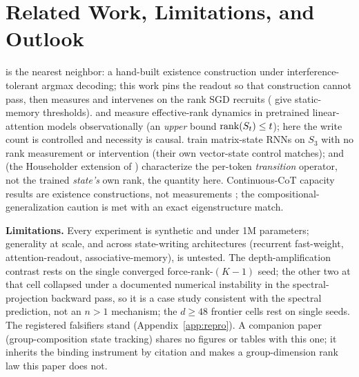 \section{Related Work, Limitations, and Outlook}
\label{sec:related}

\citet{nichani2025factual} is the nearest neighbor: a hand-built
existence construction under interference-tolerant argmax decoding;
this work pins the readout so that construction cannot pass, then
measures and intervenes on the rank SGD recruits
(\citealp{barnfield2026sharp} give static-memory thresholds).
\citet{nazari2026rank} and \citet{sun2026staterank} measure
effective-rank dynamics in pretrained linear-attention models
observationally (an \emph{upper} bound $\operatorname{rank}(S_t) \leq t$); here the
write count is controlled and necessity is causal. \citet{mishra2026m2rnn} train matrix-state RNNs on $S_3$ with no rank
measurement or intervention (their own vector-state control matches);
\citet{grazzi2025negative} and \citet{siems2025deltaproduct} (the
Householder extension of \citealp{yang2024deltanet}) characterize the
per-token \emph{transition} operator, not the trained \emph{state's}
own rank, the quantity here. Continuous-CoT capacity
results are existence constructions, not measurements
\citep{zhu2025superposition,gozeten2025cot2}; the
compositional-generalization caution
\citep{dziri2023faithfate,wang2024grokked} is met with an exact
eigenstructure match.

\textbf{Limitations.} Every experiment is synthetic and under 1M
parameters; generality at scale, and across state-writing architectures
(recurrent fast-weight, attention-readout, associative-memory), is
untested.
The depth-amplification contrast rests on the single converged
force-rank-$(K{-}1)$ seed; the other two at that cell collapsed under
a documented numerical instability in the spectral-projection backward
pass, so it is a case study consistent with the spectral prediction,
not an $n{>}1$ mechanism; the $d \geq 48$ frontier cells rest on
single seeds. The registered falsifiers stand
(Appendix~\ref{app:repro}). A companion paper \citep{larson2026ranklaw}
(group-composition state tracking) shares no figures or tables with
this one; it inherits the binding instrument by citation and makes a
group-dimension rank law this paper does not.
